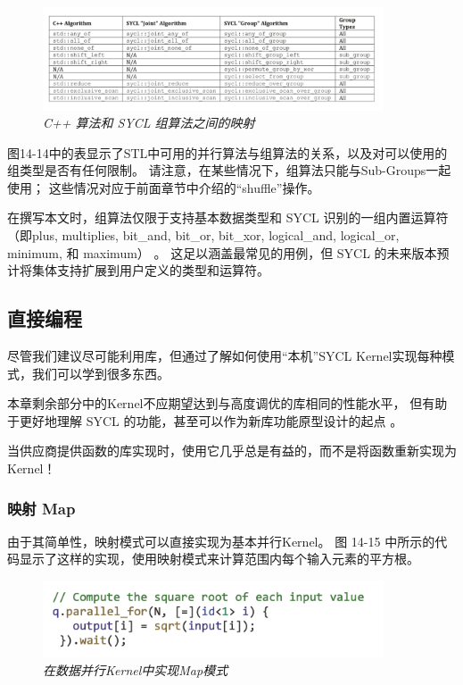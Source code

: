 \begin{figure}[H]
	\centering
	\includegraphics[width=0.9\textwidth]{figs/F14.14.png}
	\caption{\textit{C++ 算法和 SYCL 组算法之间的映射 }}
\end{figure}

图14-14中的表显示了STL中可用的并行算法与组算法的关系，以及对可以使用的组类型是否有任何限制。 
请注意，在某些情况下，组算法只能与Sub-Groups一起使用； 这些情况对应于前面章节中介绍的“shuffle”操作。

在撰写本文时，组算法仅限于支持基本数据类型和 SYCL 识别的一组内置运算符
（即plus, multiplies, bit\_and, bit\_or, bit\_xor, logical\_and, logical\_or, minimum, 和 maximum） 。 
这足以涵盖最常见的用例，但 SYCL 的未来版本预计将集体支持扩展到用户定义的类型和运算符。

\subsection{直接编程}
尽管我们建议尽可能利用库，但通过了解如何使用“本机”SYCL Kernel实现每种模式，我们可以学到很多东西。

本章剩余部分中的Kernel不应期望达到与高度调优的库相同的性能水平，
但有助于更好地理解 SYCL 的功能，甚至可以作为新库功能原型设计的起点 。

\begin{remark}[使用供应商提供的库！]
当供应商提供函数的库实现时，使用它几乎总是有益的，而不是将函数重新实现为Kernel！
\end{remark}

\subsubsection{映射 Map}
由于其简单性，映射模式可以直接实现为基本并行Kernel。 
图 14-15 中所示的代码显示了这样的实现，使用映射模式来计算范围内每个输入元素的平方根。

\begin{figure}[H]
	\centering
	\includegraphics[width=0.9\textwidth]{figs/F14.15.png}
	\caption{\textit{在数据并行Kernel中实现Map模式 }}
\end{figure}

